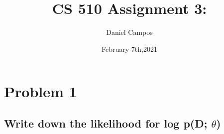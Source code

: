 \documentclass[11pt]{article}
\title{CS 510 Assignment 3:}
\author{Daniel Campos}
\date{February 7th,2021}
\begin{document}
\maketitle
\section{Problem 1}
\subsection{Write down the likelihood for log p(D; $\theta$) }
\subsection{}
\end{document}
